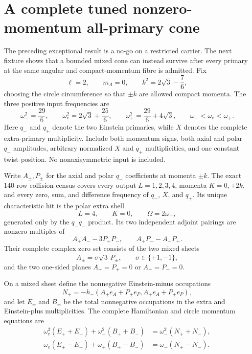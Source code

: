 \documentclass[11pt]{article}
\theoremstyle{definition}
\theoremstyle{remark}
\begin{document}
\section{A complete tuned nonzero-momentum all-primary cone}

The preceding exceptional result is a no-go on a restricted carrier.  The
next fixture shows that a bounded mixed cone can instead survive after every
primary at the same angular and compact-momentum fibre is admitted.  Fix
\begin{equation}\label{eq:tuned-k}
 \ell=2,\qquad m_A=0,\qquad
 k^2=2\sqrt3-\frac76,
\end{equation}
choosing the circle circumference so that \(\pm k\) are allowed compact
momenta.  The three positive input frequencies are
\begin{equation}
 \omega_-^2=\frac{29}{6},\qquad
 \omega_e^2=2\sqrt3+\frac{25}{6},\qquad
 \omega_+^2=\frac{29}{6}+4\sqrt3,
 \qquad \omega_-<\omega_e<\omega_+.
\end{equation}
Here \(q_-\) and \(q_+\) denote the two Einstein primaries, while \(X\)
denotes the complete extra-primary multiplicity.  Include both momentum
signs, both axial and polar \(q_-\) amplitudes, arbitrary normalized \(X\)
and \(q_+\) multiplicities, and one constant twist position.  No
nonaxisymmetric input is included.

Write \(A_\pm,P_\pm\) for the axial and polar \(q_-\) coefficients at
momenta \(\pm k\).  The exact 140-row collision census covers every output
\(L=1,2,3,4\), momenta \(K=0,\pm2k\), and every zero, sum, and difference
frequency of \(q_-\), \(X\), and \(q_+\).  Its unique characteristic hit is
the polar extra shell
\begin{equation}
 L=4,\qquad K=0,\qquad \Omega=2\omega_-,
\end{equation}
generated only by the \(q_-q_-\) product.  Its two independent adjoint
pairings are nonzero multiples of
\begin{equation}\label{eq:tuned-resonance-ideal}
 A_+A_- -3P_+P_-,
 \qquad
 A_+P_- -A_-P_+.
\end{equation}
Their complete complex zero set consists of the two mixed sheets
\begin{equation}\label{eq:tuned-mixed-sheets}
 A_\pm=\sigma\sqrt3\,P_\pm,
 \qquad \sigma\in\{+1,-1\},
\end{equation}
and the two one-sided planes
\(A_+=P_+=0\) or \(A_-=P_-=0\).

On a mixed sheet define the nonnegative Einstein-minus occupations
\begin{equation}
 N_\pm=-h_-(A_\pm e_A+P_\pm e_P,
                   A_\pm e_A+P_\pm e_P),
\end{equation}
and let \(E_\pm\) and \(B_\pm\) be the total nonnegative occupations in the
extra and Einstein-plus multiplicities.  The complete Hamiltonian and circle
momentum equations are
\begin{align}
 \omega_e^2(E_++E_-)+\omega_+^2(B_++B_-)
   &=\omega_-^2(N_++N_-),\label{eq:tuned-energy}\\
 \omega_e(E_+-E_-)+\omega_+(B_+-B_-)
   &=\omega_-(N_+-N_-).\label{eq:tuned-momentum}
\end{align}
\end{document}
